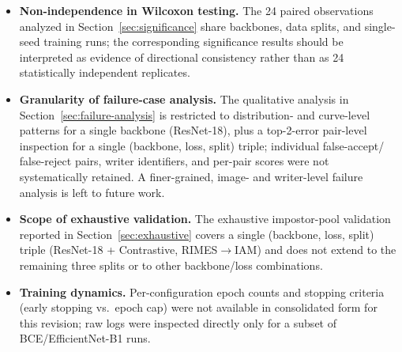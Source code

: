 \begin{itemize}
  \item \textbf{Non-independence in Wilcoxon testing.} The 24 paired
  observations analyzed in Section~\ref{sec:significance} share
  backbones, data splits, and single-seed training runs; the
  corresponding significance results should be interpreted as
  evidence of directional consistency rather than as 24 statistically
  independent replicates.

  \item \textbf{Granularity of failure-case analysis.} The
  qualitative analysis in Section~\ref{sec:failure-analysis} is
  restricted to distribution- and curve-level patterns for a single
  backbone (ResNet-18), plus a top-2-error pair-level inspection for
  a single (backbone, loss, split) triple; individual false-accept/
  false-reject pairs, writer identifiers, and per-pair scores were
  not systematically retained. A finer-grained, image- and
  writer-level failure analysis is left to future work.

  \item \textbf{Scope of exhaustive validation.} The exhaustive
  impostor-pool validation reported in Section~\ref{sec:exhaustive}
  covers a single (backbone, loss, split) triple (ResNet-18 +
  Contrastive, RIMES$\to$IAM) and does not extend to the remaining
  three splits or to other backbone/loss combinations.

  \item \textbf{Training dynamics.} Per-configuration epoch counts
  and stopping criteria (early stopping vs.\ epoch cap) were not
  available in consolidated form for this revision; raw logs were
  inspected directly only for a subset of BCE/EfficientNet-B1 runs.
\end{itemize}